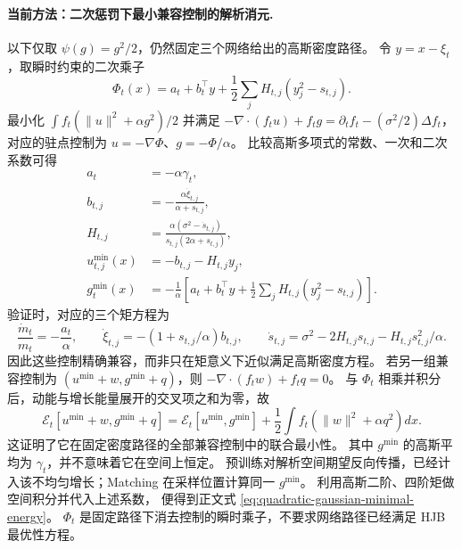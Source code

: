 \documentclass[UTF8,a4paper,11pt,fontset=fandol]{ctexart}
\begin{document}
\paragraph{当前方法：二次惩罚下最小兼容控制的解析消元.}
以下仅取 $\psi(g)=g^2/2$，仍然固定三个网络给出的高斯密度路径。
令 $y=x-\xi_t$，取瞬时约束的二次乘子
\begin{equation}
\Phi_t(x)=a_t+b_t^\top y
+\frac12\sum_j H_{t,j}(y_j^2-s_{t,j}).
\end{equation}
最小化 $\int f_t(\|u\|^2+\alpha g^2)/2$ 并满足
$-\nabla\cdot(f_tu)+f_tg=\partial_tf_t-(\sigma^2/2)\Delta f_t$，
对应的驻点控制为 $u=-\nabla\Phi$、$g=-\Phi/\alpha$。
比较高斯多项式的常数、一次和二次系数可得
\begin{equation}
\begin{aligned}
a_t&=-\alpha\gamma_t,\\
b_{t,j}&=-\frac{\alpha\dot\xi_{t,j}}{\alpha+s_{t,j}},\\
H_{t,j}&=\frac{\alpha(\sigma^2-\dot s_{t,j})}
{s_{t,j}(2\alpha+s_{t,j})},\\
u_{t,j}^{\min}(x)&=-b_{t,j}-H_{t,j}y_j,\\
g_t^{\min}(x)&=-\frac1\alpha
\left[a_t+b_t^\top y+\frac12\sum_jH_{t,j}(y_j^2-s_{t,j})\right].
\end{aligned}
\label{eq:quadratic-minimal-gaussian-controls}
\end{equation}
验证时，对应的三个矩方程为
\begin{equation}
\frac{\dot m_t}{m_t}=-\frac{a_t}{\alpha},\qquad
\dot\xi_{t,j}=-(1+s_{t,j}/\alpha)b_{t,j},\qquad
\dot s_{t,j}=\sigma^2-2H_{t,j}s_{t,j}-H_{t,j}s_{t,j}^2/\alpha.
\end{equation}
因此这些控制精确兼容，而非只在矩意义下近似满足高斯密度方程。
若另一组兼容控制为 $(u^{\min}+w,g^{\min}+q)$，则
$-\nabla\cdot(f_tw)+f_tq=0$。
与 $\Phi_t$ 相乘并积分后，动能与增长能量展开的交叉项之和为零，故
\begin{equation}
\mathcal E_t[u^{\min}+w,g^{\min}+q]
=\mathcal E_t[u^{\min},g^{\min}]
+\frac12\int f_t(\|w\|^2+\alpha q^2)dx.
\end{equation}
这证明了它在固定密度路径的全部兼容控制中的联合最小性。
其中 $g^{\min}$ 的高斯平均为 $\gamma_t$，并不意味着它在空间上恒定。
预训练对解析空间期望反向传播，已经计入该不均匀增长；Matching 在采样位置计算同一 $g^{\min}$。
利用高斯二阶、四阶矩做空间积分并代入上述系数，
便得到正文式 \eqref{eq:quadratic-gaussian-minimal-energy}。
$\Phi_t$ 是固定路径下消去控制的瞬时乘子，不要求网络路径已经满足 HJB 最优性方程。
\end{document}
